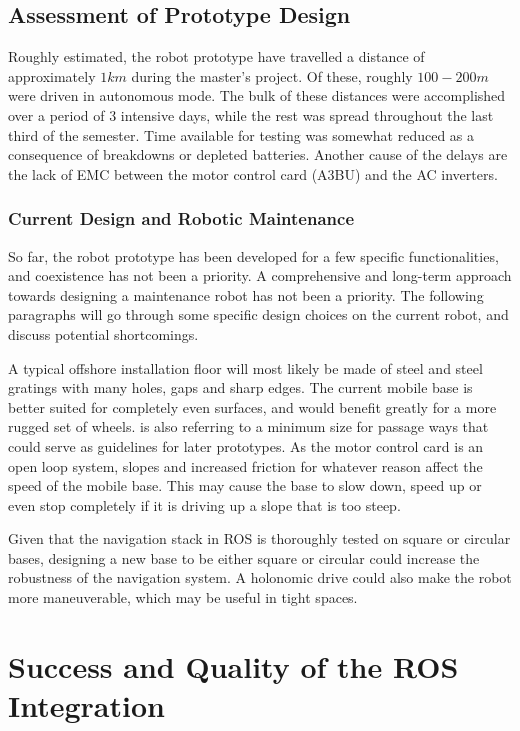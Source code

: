 \subsection{Assessment of Prototype Design}

Roughly estimated, the robot prototype have travelled a distance of approximately $1km$ during the master's project. Of these, roughly $100-200m$ were driven in autonomous mode. The bulk of these distances were accomplished over a period of 3 intensive days, while the rest was spread throughout the last third of the semester. Time available for testing was somewhat reduced as a consequence of breakdowns or depleted batteries. Another cause of the delays are the lack of \ac{EMC} between the motor control card (A3BU) and the AC inverters. 

\subsubsection{Current Design and Robotic Maintenance}

So far, the robot prototype has been developed for a few specific functionalities, and coexistence has not been a priority. A comprehensive and long-term approach towards designing a maintenance robot has not been a priority. The following paragraphs will go through some specific design choices on the current robot, and discuss potential shortcomings. 

A typical offshore installation floor will most likely be made of steel and steel gratings with many holes, gaps and sharp edges\cite{graf2008mobile}. The current mobile base is better suited for completely even surfaces, and would benefit greatly for a more rugged set of wheels. \cite{graf2008mobile} is also referring to a minimum size for passage ways that could serve as guidelines for later prototypes. As the motor control card is an open loop system, slopes and increased friction for whatever reason affect the speed of the mobile base. This may cause the base to slow down, speed up or even stop completely if it is driving up a slope that is too steep.

Given that the navigation stack in \ac{ROS} is thoroughly tested on square or circular bases, designing a new base to be either square or circular could increase the robustness of the navigation system. A holonomic drive could also make the robot more maneuverable, which may be useful in tight spaces.

\section{Success and Quality of the ROS Integration}

